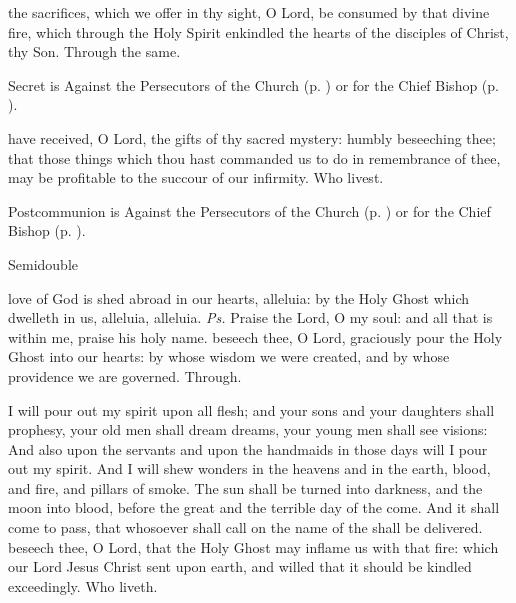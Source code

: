\secret
{} the sacrifices, which we offer in thy sight, O Lord, be consumed by that divine fire, which through the Holy Spirit enkindled the hearts of the disciples of Christ, thy Son. Through the same.
\begin{rubric}
     Secret is Against the Persecutors of the Church (p. \pageref{SPAgainst}) or for the Chief Bishop (p. \pageref{SPChiefBishop}).
\end{rubric}

\postcommunion
{} have received, O Lord, the gifts of thy sacred mystery: humbly beseeching thee; that those things which thou hast commanded us to do in remembrance of thee, may be profitable to the succour of our infirmity. Who livest.
\begin{rubric}
     Postcommunion is Against the Persecutors of the Church (p. \pageref{SPAgainst}) or for the Chief Bishop (p. \pageref{SPChiefBishop}).
\end{rubric}


\begin{inhead}
    {Semidouble}
\end{inhead}

\introit
{} love of God is shed abroad in our hearts, alleluia: by the Holy Ghost which dwelleth in us, alleluia, alleluia. \textit{Ps.} Praise the Lord, O my soul: and all that is within me, praise his holy name.
\collect
{} beseech thee, O Lord, graciously pour the Holy Ghost into our hearts: by whose wisdom we were created, and by whose providence we are governed. Through.

 I will pour out my spirit upon all flesh; and your sons and your daughters shall prophesy, your old men shall dream dreams, your young men shall see visions: And also upon the servants and upon the handmaids in those days will I pour out my spirit. And I will shew wonders in the heavens and in the earth, blood, and fire, and pillars of smoke. The sun shall be turned into darkness, and the moon into blood, before the great and the terrible day of the  come. And it shall come to pass, that whosoever shall call on the name of the  shall be delivered.
\collect
{} beseech thee, O Lord, that the Holy Ghost may inflame us with that fire: which our Lord Jesus Christ sent upon earth, and willed that it should be kindled exceedingly. Who liveth.

